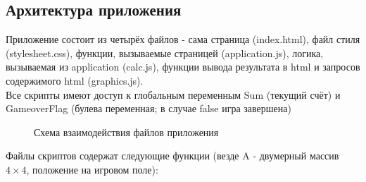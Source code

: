 \documentclass[a4paper,12pt]{article}
\begin{document}
\subsection{Архитектура приложения}
Приложение состоит из четырёх файлов - сама страница (index.html), файл стиля (stylesheet.css), функции, вызываемые страницей (application.js), логика, вызываемая из application (calc.js), функции вывода результата в html и запросов содержимого html (graphics.js).\\
Все скрипты имеют доступ к глобальным переменным Sum (текущий счёт) и GameoverFlag (булева переменная; в случае false игра завершена)
\begin{figure}[H]
\caption{Схема взаимодействия файлов приложения}
\label{move}
\end{figure}
Файлы скриптов содержат следующие функции (везде A - двумерный массив $4\times4$, положение на игровом поле):
\end{document}
